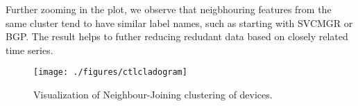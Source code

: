 Further zooming in the plot, we observe that neigbhouring features from the same cluster tend to have similar label names, such as starting with \textsf{SVCMGR} or \textsf{BGP}.
The result helps to futher reducing redudant data based on closely related time series. 

\begin{figure}
	\texttt{[image: ./figures/ctlcladogram]}
	\caption{Visualization of Neighbour-Joining clustering of devices.}
	\label{Fig:nj-vis}
\end{figure}